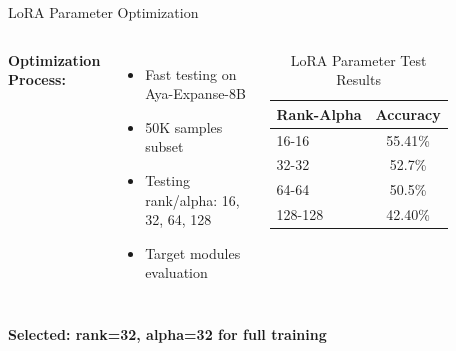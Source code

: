\begin{frame}{LoRA Parameter Optimization}
    \begin{columns}[T]
        \textbf{Optimization Process:}
        \begin{itemize}
            \item Fast testing on Aya-Expanse-8B
            \item 50K samples subset
            \item Testing rank/alpha: 16, 32, 64, 128
            \item Target modules evaluation
        \end{itemize}
        
        \begin{table}[h]
            \centering
            \small
            \caption{LoRA Parameter Test Results}
            \begin{tabular}{l|c}
                \toprule
                \textbf{Rank-Alpha} & \textbf{Accuracy} \\
                \midrule
                16-16 & \textcolor{improvement}{55.41\%} \\
                32-32 & 52.7\% \\
                64-64 & 50.5\% \\
                128-128 & 42.40\% \\
                \bottomrule
            \end{tabular}
        \end{table}
    \end{columns}
    
    \vspace{0.5em}
    \begin{center}
        \colorbox{improvement!20}{\textbf{Selected: rank=32, alpha=32 for full training}}
    \end{center}
\end{frame}


